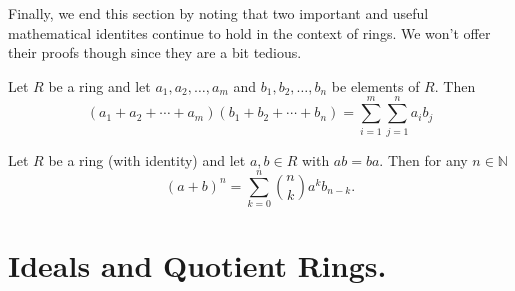     Finally, we end this section by noting that two important and
    useful mathematical identites continue to hold in the context
    of rings. We won't offer their
    proofs though since they are a bit tedious. 
    
    \begin{proposition}
        Let $R$ be a ring and let $a_1, a_2, \dots, a_m$ and $b_1,
        b_2, \dots, b_n$ be elements of $R$. Then 
        \[
            (a_1 + a_2 + \cdots + a_m)(b_1 + b_2 + \cdots + b_n) 
            = \sum_{i = 1}^{m}\sum_{j = 1}^{n}a_ib_j
        \]
    \end{proposition}

    \begin{proposition}
        Let $R$ be a ring (with identity) and let $a, b \in R$
        with $ab = ba$. Then for any $n \in \mathbb{N}$ 
        \[
            (a + b)^n = \sum_{k = 0}^{n} {n\choose k} a^kb_{n-k}.
        \]
    \end{proposition}



    \newpage
    \section{Ideals and Quotient Rings.}
    
